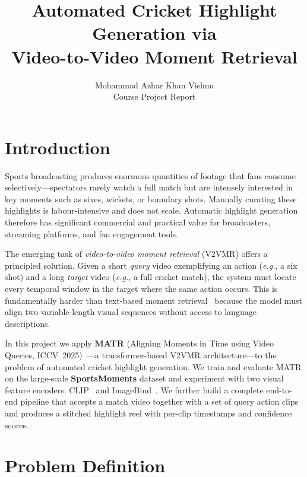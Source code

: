 \documentclass[10pt,twocolumn]{article}
\title{%
  \textbf{Automated Cricket Highlight Generation via\\
  Video-to-Video Moment Retrieval}
}
\author{%
  Mohammad Azhar Khan \quad Vishnu\\[2pt]
  \small Course Project Report
}
\date{}
\begin{document}
\maketitle
\thispagestyle{empty}

\section{Introduction}

Sports broadcasting produces enormous quantities of footage that fans consume
selectively—spectators rarely watch a full match but are intensely interested in
key moments such as sixes, wickets, or boundary shots. Manually curating these
highlights is labour-intensive and does not scale. Automatic highlight
generation therefore has significant commercial and practical value for
broadcasters, streaming platforms, and fan engagement tools.

The emerging task of \emph{video-to-video moment retrieval} (V2VMR) offers a
principled solution. Given a short \emph{query} video exemplifying an action
(\textit{e.g.}, a six shot) and a long \emph{target} video (\textit{e.g.}, a
full cricket match), the system must locate every temporal window in the target
where the same action occurs. This is fundamentally harder than text-based
moment retrieval~\cite{lei2021qvhighlights} because the model must align two
variable-length visual sequences without access to language descriptions.

In this project we apply \textbf{MATR} (Aligning Moments in Time using Video
Queries, ICCV~2025)~\cite{kumar2025matr}—a transformer-based V2VMR
architecture—to the problem of automated cricket highlight generation. We train
and evaluate MATR on the large-scale \textbf{SportsMoments} dataset and
experiment with two visual feature encoders: CLIP~\cite{radford2021clip} and
ImageBind~\cite{girdhar2023imagebind}. We further build a complete end-to-end
pipeline that accepts a match video together with a set of query action clips
and produces a stitched highlight reel with per-clip timestamps and confidence
scores.

\section{Problem Definition}
\end{document}
